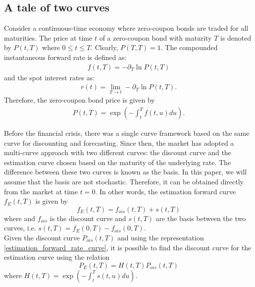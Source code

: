 \documentclass[a4paper,10pt]{article}
\newcommand{\1}{\mathbf{1}}
\begin{document}
\subsection{A tale of two curves}
Consider a continuous-time economy where zero-coupon bonds are traded for all maturities. The price at time $t$ of a zero-coupon bond with maturity $T$ is denoted by $P(t,T)$ where $0\leq t \leq T$. Clearly, $P(T,T)=1$. The compounded instantaneous forward rate is defined as:
\begin{eqnarray*}
f(t,T)= -\partial_{T}\ln P(t,T)
\end{eqnarray*}
and the spot interest rates as:
\begin{eqnarray*}
r(t)=\lim_{T\longrightarrow t} -\partial_{T}\ln P(t,T).
\end{eqnarray*}
Therefore, the zero-coupon bond price is given by
\begin{eqnarray*}
P(t,T)=\exp\left(-\int^{T}_{t} f(t,u) du\right).
\end{eqnarray*}

Before the financial crisis, there was a single curve framework based on the same curve for discounting and forecasting. Since then, the market has adopted a multi-curve approach with two different curves: the discount curve and the estimation curve chosen based on the maturity of the underlying rate. The difference between these two curves is known as the basis. In this paper, we will assume that the basis are not stochastic. Therefore, it can be obtained directly from the market at time $t=0$. In other words, the estimation forward curve $f_{E}(t, T)$ is given by
\begin{equation}\label{estimation_forward_rate_curve}
f_{E}(t,T) = f_{ois}(t,T) + s(t,T)
\end{equation}
where and $f_{ois}$ is the discount curve and $s(t,T)$ are the basis between the two curves, i.e. $s(t,T)= f_{E}(0,T) - f_{ois}(0,T)$.\\

Given the discount curve $P_{ois}(t,T)$ and using the representation \eqref{estimation_forward_rate_curve}, it is possible to find the discount curve for the estimation curve using the relation
\begin{equation}\label{bond_forward}
P_{E}(t,T)=H(t,T)P_{ois}(t,T)
\end{equation}
where $H(t,T)=\exp\left(-\int_{t}^{T}s(t,u) du \right)$.
\end{document}
